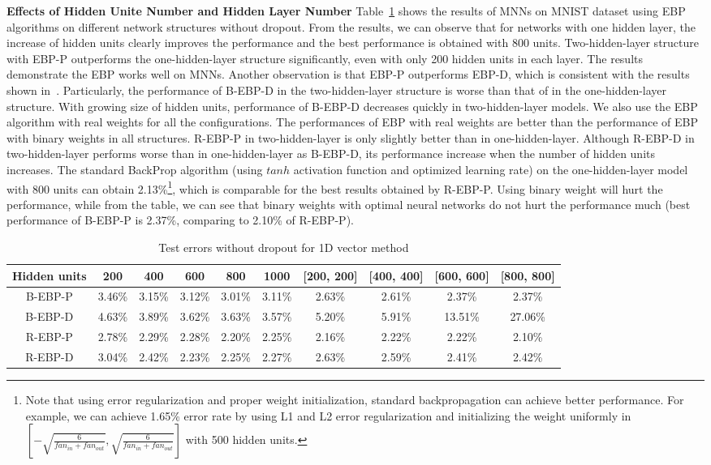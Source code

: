 \documentclass{article} %
\begin{document}
\textbf{Effects of Hidden Unite Number and Hidden Layer Number} Table~\ref{tab:1d_without_dropout} shows the results of MNNs on MNIST dataset using EBP algorithms on different network structures without dropout. From the results, we can observe that for networks with one hidden layer, the increase of hidden units clearly improves the performance and the best performance is obtained with 800 units. Two-hidden-layer structure with EBP-P outperforms the one-hidden-layer structure significantly, even with only 200 hidden units in each layer. The results demonstrate the EBP works well on MNNs. Another observation is that EBP-P outperforms EBP-D, which is consistent with the results shown in~\citet{Soudry14}. Particularly, the performance of B-EBP-D in the two-hidden-layer structure is worse than that of in the one-hidden-layer structure. With growing size of hidden units, performance of B-EBP-D decreases quickly in two-hidden-layer models. We also use the EBP algorithm with real weights for all the configurations. The performances of EBP with real weights are better than the performance of EBP with binary weights in all structures. R-EBP-P in two-hidden-layer is only slightly better than  in one-hidden-layer. Although R-EBP-D in two-hidden-layer performs worse than in one-hidden-layer as B-EBP-D, its performance increase  when the number of hidden units increases. The standard BackProp algorithm (using $tanh$ activation function and optimized learning rate) on the one-hidden-layer model with 800 units can obtain 2.13\%\footnote{Note that using error regularization and proper weight initialization, standard backpropagation can achieve better performance. For example, we can achieve 1.65\% error rate by using L1 and L2 error regularization and initializing the weight uniformly in $[-\sqrt{\frac{6}{fan_{in}+fan_{out}}}, \sqrt{\frac{6}{fan_{in}+fan_{out}}}]$ with 500 hidden units.}, which is comparable for the best results obtained by R-EBP-P. Using binary weight will hurt the performance, while from the table, we can see that binary weights with optimal neural networks do not hurt the performance much (best performance of B-EBP-P is 2.37\%, comparing to 2.10\% of R-EBP-P).

\begin{table}
\scriptsize
\centering
\caption{Test errors without dropout for 1D vector method}
\begin{tabular}{|c||c|c|c|c|c||c|c|c|c|} \hline
Hidden units	&	200	&	400	&	600	&	800	&	1000	&	[200, 200]	&	[400, 400]	&	[600, 600]	&	[800, 800]	\\ \hline \hline
B-EBP-P	&	3.46\%	&	3.15\%	&	3.12\%	&	3.01\%	&	3.11\%	&	2.63\%	&	2.61\%	&	2.37\%	&	2.37\%	\\ \hline
B-EBP-D	&	4.63\%	&	3.89\%	&	3.62\%	&	3.63\%	&	3.57\%	&	5.20\%	&	5.91\%	&	13.51\%	&	27.06\%	\\ \hline \hline
R-EBP-P	&	2.78\%	&	2.29\%	&	2.28\%	&	2.20\%	&	2.25\%	&	2.16\%	&	2.22\%	&	2.22\%	&	2.10\%	\\ \hline
R-EBP-D	&	3.04\%	&	2.42\%	&	2.23\%	&	2.25\%	&	2.27\%	&	2.63\%	&	2.59\%	&	2.41\%	&	2.42\%	\\ \hline
\end{tabular}
 \label{tab:1d_without_dropout}
\end{table}
\end{document}
